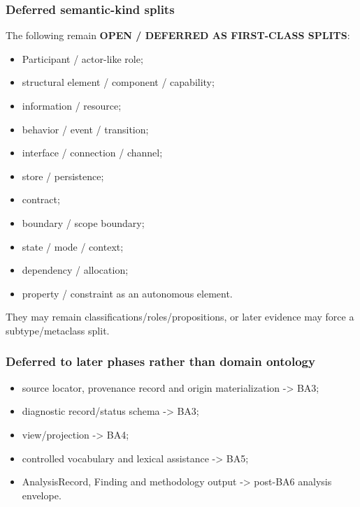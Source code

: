 \documentclass[
]{article}
\providecommand{\tightlist}{%
  \setlength{\itemsep}{0pt}\setlength{\parskip}{0pt}}
\begin{document}
\subsubsection{Deferred semantic-kind
splits}\label{deferred-semantic-kind-splits}

The following remain \textbf{OPEN / DEFERRED AS FIRST-CLASS SPLITS}:

\begin{itemize}
\tightlist
\item
  Participant / actor-like role;
\item
  structural element / component / capability;
\item
  information / resource;
\item
  behavior / event / transition;
\item
  interface / connection / channel;
\item
  store / persistence;
\item
  contract;
\item
  boundary / scope boundary;
\item
  state / mode / context;
\item
  dependency / allocation;
\item
  property / constraint as an autonomous element.
\end{itemize}

They may remain classifications/roles/propositions, or later evidence
may force a subtype/metaclass split.

\subsubsection{Deferred to later phases rather than domain
ontology}\label{deferred-to-later-phases-rather-than-domain-ontology}

\begin{itemize}
\tightlist
\item
  source locator, provenance record and origin materialization
  -\textgreater{} BA3;
\item
  diagnostic record/status schema -\textgreater{} BA3;
\item
  view/projection -\textgreater{} BA4;
\item
  controlled vocabulary and lexical assistance -\textgreater{} BA5;
\item
  AnalysisRecord, Finding and methodology output -\textgreater{}
  post-BA6 analysis envelope.
\end{itemize}
\end{document}
